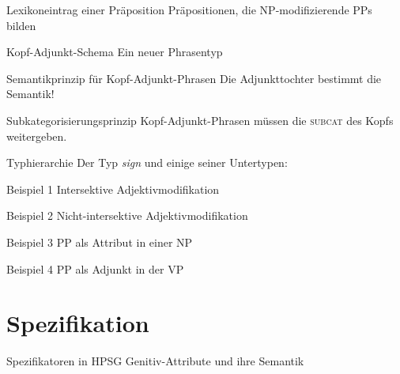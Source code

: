 \begin{frame}
  {Lexikoneintrag einer Präposition}
  \onslide<+->
  \onslide<+->
  Präpositionen, die NP-modifizierende PPs bilden
\end{frame}

\begin{frame}
  {Kopf-Adjunkt-Schema}
  \onslide<+->
  \onslide<+->
  Ein neuer Phrasentyp
\end{frame}

\begin{frame}
  {Semantikprinzip für Kopf-Adjunkt-Phrasen}
  \onslide<+->
  \onslide<+->
  Die Adjunkttochter bestimmt die Semantik!
\end{frame}

\begin{frame}
  {Subkategorisierungsprinzip}
  \onslide<+->
  \onslide<+->
  Kopf-Adjunkt-Phrasen müssen die \textsc{subcat} des Kopfs weitergeben.
\end{frame}

\begin{frame}
  {Typhierarchie}
  \onslide<+->
  \onslide<+->
  Der Typ \textit{sign} und einige seiner Untertypen:
\end{frame}

\begin{frame}
  {Beispiel 1}
  \onslide<+->
  \onslide<+->
  Intersektive Adjektivmodifikation
\end{frame}

\begin{frame}
  {Beispiel 2}
  \onslide<+->
  \onslide<+->
  Nicht-intersektive Adjektivmodifikation
\end{frame}

\begin{frame}
  {Beispiel 3}
  \onslide<+->
  \onslide<+->
  PP als Attribut in einer NP
\end{frame}

\begin{frame}
  {Beispiel 4}
  \onslide<+->
  \onslide<+->
  PP als Adjunkt in der VP
\end{frame}

\section{Spezifikation}

\begin{frame}
  {Spezifikatoren in HPSG}
  \onslide<+->
  \onslide<+->
  Genitiv-Attribute und ihre Semantik
\end{frame}

